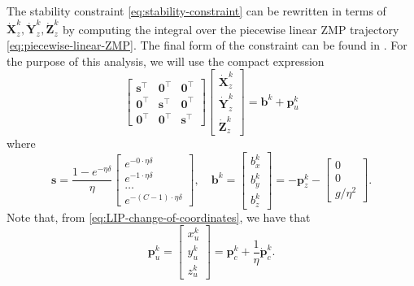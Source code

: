 The stability constraint \eqref{eq:stability-constraint} can be rewritten in 
terms of $\dot{\bm{X}}_z^k, \dot{\bm{Y}}_z^k, \dot{\bm{Z}}_z^k$ by computing
the integral over the piecewise linear ZMP trajectory \eqref{eq:piecewise-linear-ZMP}.
The final form of the constraint can be found in \cite{Scianca2020TRO}.
For the purpose of this analysis, we will use the compact expression
\begin{equation}
    \label{eq:stability-constraint-matrix}
    \begin{bmatrix}
        \bm{s}^\top & \bm{0}^\top & \bm{0}^\top \\
        \bm{0}^\top & \bm{s}^\top & \bm{0}^\top \\
        \bm{0}^\top & \bm{0}^\top & \bm{s}^\top
    \end{bmatrix}
    \begin{bmatrix}
        \dot{\bm{X}}_z^k \\ \dot{\bm{Y}}_z^k \\ \dot{\bm{Z}}_z^k
    \end{bmatrix}
    =
    \bm{b}^k + \bm{p}_u^k
\end{equation}
where
\begin{equation}
    \bm{s} =
    \frac{1-e^{-\eta\delta}}{\eta}
    \begin{bmatrix}
        e^{-0\cdot\eta\delta} \\
        e^{-1\cdot\eta\delta} \\
        \dots \\
        e^{-(C-1)\cdot\eta\delta}
    \end{bmatrix}, \quad
    \bm{b}^k
    =
    \begin{bmatrix}
        b_x^k \\ b_y^k \\ b_z^k
    \end{bmatrix}
    =
    -\bm{p}_z^k -
    \begin{bmatrix}
        0 \\ 0 \\ g / \eta^2
    \end{bmatrix}.
\end{equation}
Note that, from \ref{eq:LIP-change-of-coordinates}, we have that
\begin{equation}
    \bm{p}_u^k
    =
    \begin{bmatrix}
        x_u^k \\ y_u^k \\ z_u^k
    \end{bmatrix}
    =
    \bm{p}_c^k + \frac{1}{\eta} \dot{\bm{p}}_c^k.
\end{equation}

